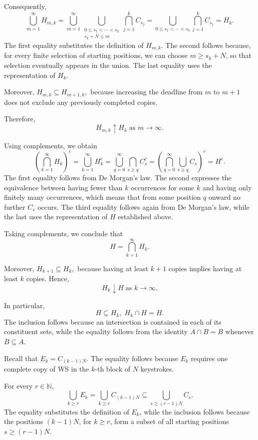 \documentclass[11pt,a4paper]{article}
\newcommand{\studyheading}[1]{{\color{StudyBlue}\normalfont\bfseries\boldmath #1}}
\newcommand{\studylabel}[1]{\textcolor{StudyBlue}{\textnormal{\bfseries #1}}}
\begin{document}
Consequently,
\[
\bigcup_{m=1}^{\infty}H_{m,k}
=
\bigcup_{m=1}^{\infty}
\bigcup_{\substack{0\le s_1<\cdots<s_k\\s_k+N\le m}}
\bigcap_{j=1}^{k}C_{s_j} 
=
\bigcup_{0\le s_1<\cdots<s_k}
\bigcap_{j=1}^{k}C_{s_j} 
=H_k.
\]
The first equality substitutes the definition of $H_{m,k}$. The second follows because, for every finite selection of starting positions, we can choose $m\ge s_k+N$, so that selection eventually appears in the union. The last equality uses the representation of $H_k$.

Moreover,
$H_{m,k}\subseteq H_{m+1,k},$
because increasing the deadline from $m$ to $m+1$ does not exclude any previously completed copies.

Therefore,
\[
H_{m,k}\uparrow H_k
\;\text{as }m\to\infty.
\]

\noindent\studyheading{\studylabel{(v)}} Using complements, we obtain
\[
\left(\bigcap_{k=1}^{\infty}H_k\right)^c
=
\bigcup_{k=1}^{\infty}H_k^c =
\bigcup_{q=0}^{\infty}
\bigcap_{s\ge q}C_s^c =
\left(
\bigcap_{q=0}^{\infty}
\bigcup_{s\ge q}C_s
\right)^c =H^c.
\]
The first equality follows from De Morgan's law. The second expresses the equivalence between having fewer than $k$ occurrences for some $k$ and having only finitely many occurrences, which means that from some position $q$ onward no further $C_s$ occurs. The third equality follows again from De Morgan's law, while the last uses the representation of $H$ established above.

Taking complements, we conclude that
\[
H=\bigcap_{k=1}^{\infty}H_k.
\]

Moreover,
$H_{k+1}\subseteq H_k,$
because having at least $k+1$ copies implies having at least $k$ copies. Hence,
\[
H_k\downarrow H
\;\text{as }k\to\infty.
\]

\noindent\studyheading{\studylabel{(ii)}} In particular,
\[
H\subseteq H_k,
\;
H_k\cap H=H.
\]
The inclusion follows because an intersection is contained in each of its constituent sets, while the equality follows from the identity $A\cap B=B$ whenever $B\subseteq A$.

\noindent\studyheading{\studylabel{(iii)}} Recall that
$E_k=C_{(k-1)N}.$
The equality follows because $E_k$ requires one complete copy of WS in the $k$-th block of $N$ keystrokes.

For every $r\in\mathbb N$,
\[
\bigcup_{k\ge r}E_k
=
\bigcup_{k\ge r}C_{(k-1)N}
\subseteq
\bigcup_{s\ge(r-1)N}C_s.
\]
The equality substitutes the definition of $E_k$, while the inclusion follows because the positions $(k-1)N$, for $k\ge r$, form a subset of all starting positions $s\ge(r-1)N$.
\end{document}
